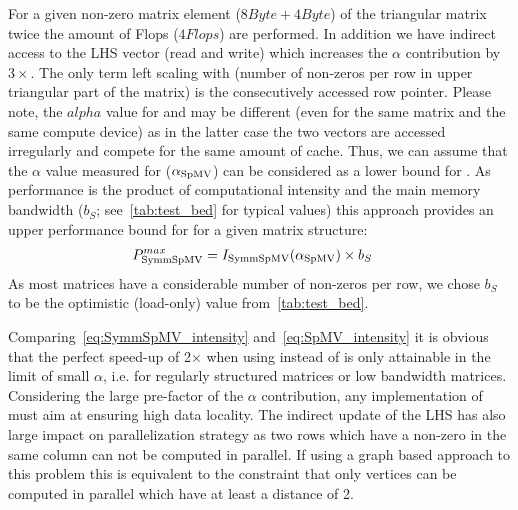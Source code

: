 For a given non-zero matrix element ($8 Byte + 4 Byte$) of the triangular matrix twice the amount of Flops ($4 Flops$)  are performed. In addition we have indirect access to the LHS vector (read and write) which increases the $\alpha$ contribution by $3\times$. The only term left scaling with \NNZRSYMM (number of non-zeros per row in upper triangular part of the matrix) is the consecutively accessed row pointer. Please note, the $alpha$ value for \SpMV and \SymmSpmv may be different (even for the same matrix and the same compute device) as in the latter case the two vectors are accessed irregularly and compete for the same amount of cache. Thus, we can assume that the $\alpha$ value measured for \SpMV ($\alpha_\mathrm{SpMV}$) can be considered as a lower bound for \SymmSpmv. As performance is the product of computational intensity and the main memory bandwidth ($b_S$; see~\cref{tab:test_bed} for typical values) this approach provides an upper performance bound for \SymmSpmv for a given matrix structure:
 \begin{align}
\label{eq:SymmSpMV_performance}
P^{max}_\mathrm{\SymmSpmv}  &= I_\mathrm{\SymmSpmv} (\alpha_\mathrm{\SpMV})  \times b_S
\end{align}
As most matrices have a considerable number of non-zeros per row, we chose $b_S$ to be the optimistic (load-only) value  from~\cref{tab:test_bed}.

Comparing~\cref{eq:SymmSpMV_intensity} and~\cref{eq:SpMV_intensity} it is obvious that the perfect speed-up of 2$\times$ when using \SymmSpmv instead of \SpMV is only attainable in the limit of small $\alpha$, i.e. for regularly structured matrices or low bandwidth matrices. Considering the large pre-factor of the $\alpha$ contribution, any implementation of \SymmSpmv must aim at ensuring high data locality. The indirect update of the LHS has also large impact on parallelization strategy as two rows which have a non-zero in the same column can not be computed in parallel. If using a graph based approach to this problem this is equivalent to the constraint that only vertices can be computed in parallel which have at least a distance of 2.

